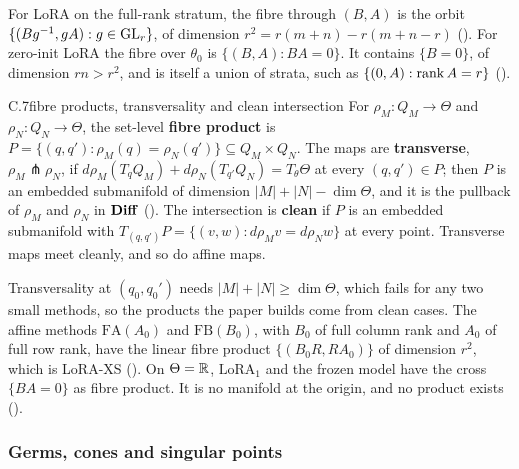 For LoRA on the full-rank stratum, the fibre through $(B,A)$ is the orbit $\{(Bg^{-1},gA):g\in\mathrm{GL}_r\}$, of dimension
$r^2=r(m+n)-r(m+n-r)$ (). For zero-init LoRA the fibre over $\theta_0$ is $\{(B,A):BA=0\}$. It contains
$\{B=0\}$, of dimension $rn>r^2$, and is itself a union of strata, such as $\{(0,A):\operatorname{rank} A=r\}$
().


\begin{bgentry}{C.7}{fibre products, transversality and clean intersection}
For $\rho_M:Q_M\to\Theta$ and $\rho_N:Q_N\to\Theta$, the set-level \textbf{fibre product} is
$P=\{(q,q'):\rho_M(q)=\rho_N(q')\}\subseteq Q_M\times Q_N$. The maps are \textbf{transverse}, $\rho_M\pitchfork\rho_N$,
if $d\rho_M(T_qQ_M)+d\rho_N(T_{q'}Q_N)=T_\theta\Theta$ at every $(q,q')\in P$; then $P$ is an embedded submanifold of
dimension $\lvert M\rvert+\lvert N\rvert-\dim\Theta$, and it is the pullback of $\rho_M$ and $\rho_N$ in $\mathbf{Diff}$
(). The intersection is \textbf{clean} if $P$ is an embedded submanifold with
$T_{(q,q')}P=\{(v,w):d\rho_Mv=d\rho_Nw\}$ at every point. Transverse maps meet cleanly, and so do affine maps.
\end{bgentry}

Transversality at $(q_0,q_0')$ needs $\lvert M\rvert+\lvert N\rvert\ge\dim\Theta$, which fails for any two small
methods, so the products the paper builds come from clean cases. The affine methods $\mathrm{FA}(A_0)$ and
$\mathrm{FB}(B_0)$, with $B_0$ of full column rank and $A_0$ of full row rank, have the linear fibre product
$\{(B_0R,RA_0)\}$ of dimension $r^2$, which is LoRA-XS \citep{baazy2024lora} (). On
$\Theta=\mathbb{R}$, $\mathrm{LoRA}_1$ and the frozen model have the cross $\{BA=0\}$ as fibre product. It is no manifold at the
origin, and no product exists ().


\subsubsection*{Germs, cones and singular points}

